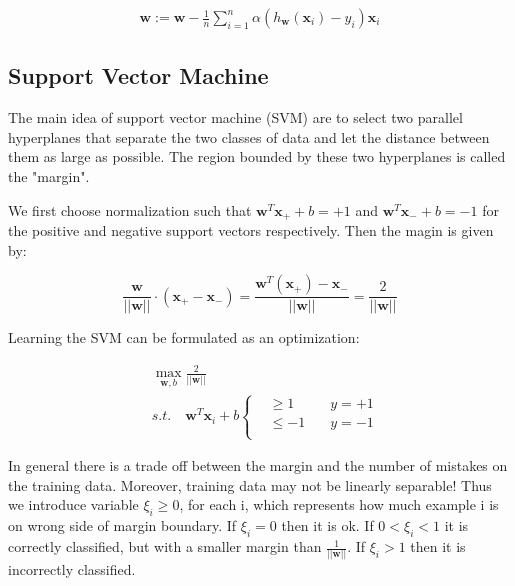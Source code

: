 \documentclass[journal, a4paper]{IEEEtran}
\begin{document}
\begin{equation}
\begin{aligned}
\textbf{w} := \textbf{w} -\frac{1}{n}\sum_{i=1}^{n} \alpha (h_\textbf{w}(\textbf{x}_i)-y_i)\textbf{x}_i
\end{aligned}
\end{equation}	

\subsection{Support Vector Machine}
The main idea of support vector machine (SVM) are to select two parallel hyperplanes that separate the two classes of data and let the distance between them as large as possible.
The region bounded by these two hyperplanes is called the "margin".

We first choose normalization such that $\textbf{w}^T \textbf{x}_+ + b = +1$ and $\textbf{w}^T \textbf{x}_- + b = -1$ for the positive and negative support vectors respectively. Then the magin is given by:

\begin{equation}
\frac{\textbf{w}}{||\textbf{w}||} \cdot (\textbf{x}_+-\textbf{x}_-) 
= \frac{\textbf{w}^T(\textbf{x}_+)-\textbf{x}_-}{||\textbf{w}||} 
= \frac{2}{||\textbf{w}||}
\end{equation}	

Learning the SVM can be formulated as an optimization:

\begin{equation}
\begin{aligned}
&\max_{\textbf{w},b} \frac{2}{||\textbf{w}||} \\
&s.t. \quad \textbf{w}^T\textbf{x}_i+b 
\left\{
\begin{aligned}
&\geq1 \quad    &y = +1 \\
&\leq-1  \quad &y = -1 \\
\end{aligned}
\right.
\end{aligned}
\end{equation}	

In general there is a trade off between the margin and the number of mistakes on the training data. Moreover, training data may not be linearly separable! Thus we introduce variable $\xi_i \geq 0$, for each i, which represents how much example i is on wrong side of margin boundary. If $\xi_i = 0$ then it is ok. If $ 0<\xi_i <1$ it is correctly classified, but with a smaller margin than $\frac{1}{||\textbf{w}||}$. If $\xi_i >1 $ then it is incorrectly classified.
\end{document}
